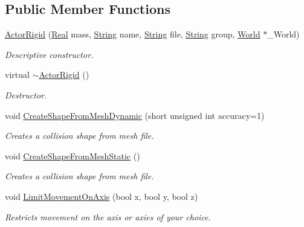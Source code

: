 \subsection*{Public Member Functions}
\begin{DoxyCompactItemize}
\item 
\hyperlink{classphys_1_1ActorRigid_ac42c05745d57eb5745de3f34e820b72d}{ActorRigid} (\hyperlink{namespacephys_af7eb897198d265b8e868f45240230d5f}{Real} mass, \hyperlink{namespacephys_aa03900411993de7fbfec4789bc1d392e}{String} name, \hyperlink{namespacephys_aa03900411993de7fbfec4789bc1d392e}{String} file, \hyperlink{namespacephys_aa03900411993de7fbfec4789bc1d392e}{String} group, \hyperlink{classphys_1_1World}{World} $\ast$\_\-World)
\begin{DoxyCompactList}\small\item\em Descriptive constructor. \item\end{DoxyCompactList}\item 
virtual \hyperlink{classphys_1_1ActorRigid_ab317b5a2578157e54655a1aea8f4d058}{$\sim$ActorRigid} ()
\begin{DoxyCompactList}\small\item\em Destructor. \item\end{DoxyCompactList}\item 
void \hyperlink{classphys_1_1ActorRigid_aab4a408ce0724be6adf4c9f51f55f8a1}{CreateShapeFromMeshDynamic} (short unsigned int accuracy=1)
\begin{DoxyCompactList}\small\item\em Creates a collision shape from mesh file. \item\end{DoxyCompactList}\item 
void \hyperlink{classphys_1_1ActorRigid_a84554dcaaf2475ba0ec7dcb9235050ac}{CreateShapeFromMeshStatic} ()
\begin{DoxyCompactList}\small\item\em Creates a collision shape from mesh file. \item\end{DoxyCompactList}\item 
void \hyperlink{classphys_1_1ActorRigid_adaed962ee8ed788612e541fb00867c78}{LimitMovementOnAxis} (bool x, bool y, bool z)
\begin{DoxyCompactList}\small\item\em Restricts movement on the axis or axies of your choice. \item\end{DoxyCompactList}\end{DoxyCompactItemize}
